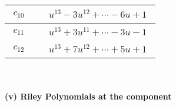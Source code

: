 \documentclass[1p]{elsarticle_modified}
\theoremstyle{definition}
\begin{document}
\begin{tabular}{m{50pt}|m{274pt}}
\hline $$\begin{aligned}c_{10}\end{aligned}$$&$\begin{aligned}
&u^{13}-3 u^{12}+\cdots-6 u+1
\end{aligned}$\\
\hline $$\begin{aligned}c_{11}\end{aligned}$$&$\begin{aligned}
&u^{13}+3 u^{11}+\cdots-3 u-1
\end{aligned}$\\
\hline $$\begin{aligned}c_{12}\end{aligned}$$&$\begin{aligned}
&u^{13}+7 u^{12}+\cdots+5 u+1
\end{aligned}$\\
\hline
\end{tabular}\\~\\
\newpage\renewcommand{\arraystretch}{1}
\flushleft \textbf{(v) Riley Polynomials at the component}\newline \\
\end{document}
